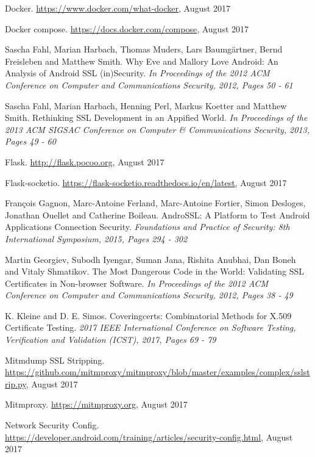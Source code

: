 \documentclass[draft,final]{vutinfth} %
\begin{document}
\begin{thebibliography}{99}
 Docker. \url{https://www.docker.com/what-docker}, August 2017

 Docker compose. \url{https://docs.docker.com/compose}, August 2017

 Sascha Fahl, Marian Harbach, Thomas Muders, Lars Baumg\"{a}rtner, Bernd Freisleben and Matthew Smith. Why Eve and Mallory Love Android: An Analysis of Android SSL (in)Security. \textit{In Proceedings of the 2012 ACM Conference on Computer and Communications Security, 2012, Pages 50 - 61}

 Sascha Fahl, Marian Harbach, Henning Perl, Markus Koetter and Matthew Smith. Rethinking SSL Development in an Appified World. \textit{In Proceedings of the 2013 ACM SIGSAC Conference on Computer \& Communications Security, 2013, Pages 49 - 60}

 Flask. \url{http://flask.pocoo.org}, August 2017

 Flask-socketio. \url{https://flask-socketio.readthedocs.io/en/latest}, August 2017

 Fran{\c{c}}ois Gagnon, Marc-Antoine Ferland, Marc-Antoine Fortier, Simon Desloges, Jonathan Ouellet and Catherine Boileau. AndroSSL: A Platform to Test Android Applications Connection Security. \textit{Foundations and Practice of Security: 8th International Symposium, 2015, Pages 294 - 302}

 Martin Georgiev, Subodh Iyengar, Suman Jana, Rishita Anubhai, Dan Boneh and Vitaly Shmatikov. The Most Dangerous Code in the World: Validating SSL Certificates in Non-browser Software. \textit{In Proceedings of the 2012 ACM Conference on Computer and Communications Security, 2012, Pages 38 - 49}

K. Kleine and D. E. Simos. Coveringcerts: Combinatorial Methods for X.509 Certificate Testing. \textit{2017 IEEE International Conference on Software Testing, Verification and Validation (ICST), 2017, Pages 69 - 79}

 Mitmdump SSL Stripping.  \url{https://github.com/mitmproxy/mitmproxy/blob/master/examples/complex/sslstrip.py}, August 2017

 Mitmproxy. \url{https://mitmproxy.org}, August 2017

 Network Security Config. \url{https://developer.android.com/training/articles/security-config.html}, August 2017


\end{thebibliography}
\end{document}
